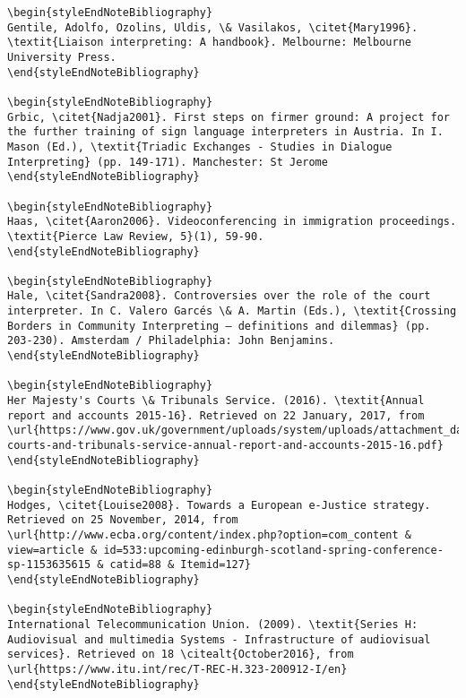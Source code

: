 \documentclass[output=paper]{langsci/langscibook}
\begin{document}
\begin{verbatim}
\begin{styleEndNoteBibliography}
Gentile, Adolfo, Ozolins, Uldis, \& Vasilakos, \citet{Mary1996}. \textit{Liaison interpreting: A handbook}. Melbourne: Melbourne University Press.
\end{styleEndNoteBibliography}

\begin{styleEndNoteBibliography}
Grbic, \citet{Nadja2001}. First steps on firmer ground: A project for the further training of sign language interpreters in Austria. In I. Mason (Ed.), \textit{Triadic Exchanges - Studies in Dialogue Interpreting} (pp. 149-171). Manchester: St Jerome 
\end{styleEndNoteBibliography}

\begin{styleEndNoteBibliography}
Haas, \citet{Aaron2006}. Videoconferencing in immigration proceedings. \textit{Pierce Law Review, 5}(1), 59-90. 
\end{styleEndNoteBibliography}

\begin{styleEndNoteBibliography}
Hale, \citet{Sandra2008}. Controversies over the role of the court interpreter. In C. Valero Garcés \& A. Martin (Eds.), \textit{Crossing Borders in Community Interpreting – definitions and dilemmas} (pp. 203-230). Amsterdam / Philadelphia: John Benjamins.
\end{styleEndNoteBibliography}

\begin{styleEndNoteBibliography}
Her Majesty's Courts \& Tribunals Service. (2016). \textit{Annual report and accounts 2015-16}. Retrieved on 22 January, 2017, from \url{https://www.gov.uk/government/uploads/system/uploads/attachment_data/file/536080/hm-courts-and-tribunals-service-annual-report-and-accounts-2015-16.pdf}
\end{styleEndNoteBibliography}

\begin{styleEndNoteBibliography}
Hodges, \citet{Louise2008}. Towards a European e-Justice strategy. Retrieved on 25 November, 2014, from \url{http://www.ecba.org/content/index.php?option=com_content & view=article & id=533:upcoming-edinburgh-scotland-spring-conference-sp-1153635615 & catid=88 & Itemid=127}
\end{styleEndNoteBibliography}

\begin{styleEndNoteBibliography}
International Telecommunication Union. (2009). \textit{Series H: Audiovisual and multimedia Systems - Infrastructure of audiovisual services}. Retrieved on 18 \citealt{October2016}, from \url{https://www.itu.int/rec/T-REC-H.323-200912-I/en}
\end{styleEndNoteBibliography}


\end{verbatim}
\end{document}
